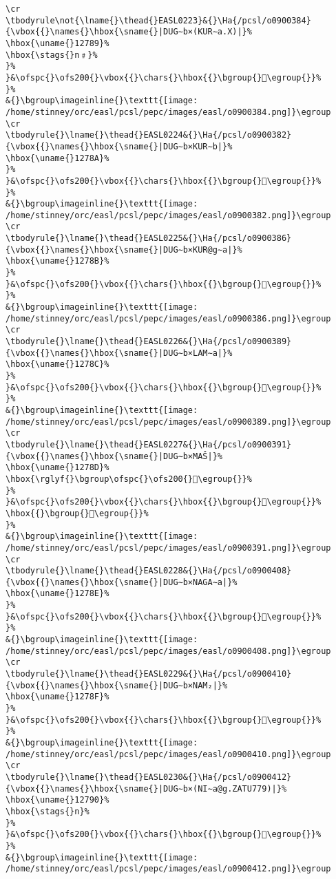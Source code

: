\begin{verbatim}
\cr
\tbodyrule\not{\lname{}\thead{}EASL0223}&{}\Ha{/pcsl/o0900384}{\vbox{{}\names{}\hbox{\sname{}|DUG∼b×(KUR∼a.X)|}%
\hbox{\uname{}12789}%
\hbox{\stags{}n﹟}%
}%
}&\ofspc{}\ofs200{}\vbox{{}\chars{}\hbox{{}\bgroup{}𒞉\egroup{}}%
}%
&{}\bgroup\imageinline{}\texttt{[image: /home/stinney/orc/easl/pcsl/pepc/images/easl/o0900384.png]}\egroup
\cr
\tbodyrule{}\lname{}\thead{}EASL0224&{}\Ha{/pcsl/o0900382}{\vbox{{}\names{}\hbox{\sname{}|DUG∼b×KUR∼b|}%
\hbox{\uname{}1278A}%
}%
}&\ofspc{}\ofs200{}\vbox{{}\chars{}\hbox{{}\bgroup{}𒞊\egroup{}}%
}%
&{}\bgroup\imageinline{}\texttt{[image: /home/stinney/orc/easl/pcsl/pepc/images/easl/o0900382.png]}\egroup
\cr
\tbodyrule{}\lname{}\thead{}EASL0225&{}\Ha{/pcsl/o0900386}{\vbox{{}\names{}\hbox{\sname{}|DUG∼b×KUR@g∼a|}%
\hbox{\uname{}1278B}%
}%
}&\ofspc{}\ofs200{}\vbox{{}\chars{}\hbox{{}\bgroup{}𒞋\egroup{}}%
}%
&{}\bgroup\imageinline{}\texttt{[image: /home/stinney/orc/easl/pcsl/pepc/images/easl/o0900386.png]}\egroup
\cr
\tbodyrule{}\lname{}\thead{}EASL0226&{}\Ha{/pcsl/o0900389}{\vbox{{}\names{}\hbox{\sname{}|DUG∼b×LAM∼a|}%
\hbox{\uname{}1278C}%
}%
}&\ofspc{}\ofs200{}\vbox{{}\chars{}\hbox{{}\bgroup{}𒞌\egroup{}}%
}%
&{}\bgroup\imageinline{}\texttt{[image: /home/stinney/orc/easl/pcsl/pepc/images/easl/o0900389.png]}\egroup
\cr
\tbodyrule{}\lname{}\thead{}EASL0227&{}\Ha{/pcsl/o0900391}{\vbox{{}\names{}\hbox{\sname{}|DUG∼b×MAŠ|}%
\hbox{\uname{}1278D}%
\hbox{\rglyf{}\bgroup\ofspc{}\ofs200{}𒞍\egroup{}}%
}%
}&\ofspc{}\ofs200{}\vbox{{}\chars{}\hbox{{}\bgroup{}𒞳\egroup{}}%
\hbox{{}\bgroup{}𒞍\egroup{}}%
}%
&{}\bgroup\imageinline{}\texttt{[image: /home/stinney/orc/easl/pcsl/pepc/images/easl/o0900391.png]}\egroup
\cr
\tbodyrule{}\lname{}\thead{}EASL0228&{}\Ha{/pcsl/o0900408}{\vbox{{}\names{}\hbox{\sname{}|DUG∼b×NAGA∼a|}%
\hbox{\uname{}1278E}%
}%
}&\ofspc{}\ofs200{}\vbox{{}\chars{}\hbox{{}\bgroup{}𒞎\egroup{}}%
}%
&{}\bgroup\imageinline{}\texttt{[image: /home/stinney/orc/easl/pcsl/pepc/images/easl/o0900408.png]}\egroup
\cr
\tbodyrule{}\lname{}\thead{}EASL0229&{}\Ha{/pcsl/o0900410}{\vbox{{}\names{}\hbox{\sname{}|DUG∼b×NAM₂|}%
\hbox{\uname{}1278F}%
}%
}&\ofspc{}\ofs200{}\vbox{{}\chars{}\hbox{{}\bgroup{}𒞏\egroup{}}%
}%
&{}\bgroup\imageinline{}\texttt{[image: /home/stinney/orc/easl/pcsl/pepc/images/easl/o0900410.png]}\egroup
\cr
\tbodyrule{}\lname{}\thead{}EASL0230&{}\Ha{/pcsl/o0900412}{\vbox{{}\names{}\hbox{\sname{}|DUG∼b×(NI∼a@g.ZATU779)|}%
\hbox{\uname{}12790}%
\hbox{\stags{}n}%
}%
}&\ofspc{}\ofs200{}\vbox{{}\chars{}\hbox{{}\bgroup{}𒞐\egroup{}}%
}%
&{}\bgroup\imageinline{}\texttt{[image: /home/stinney/orc/easl/pcsl/pepc/images/easl/o0900412.png]}\egroup

\end{verbatim}
